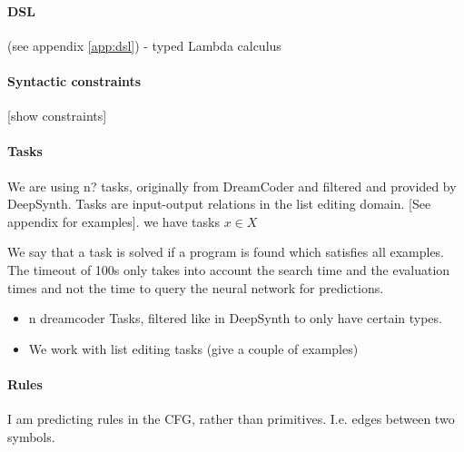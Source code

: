 \paragraph{DSL}
(see appendix \ref{app:dsl})
- typed Lambda calculus 

\paragraph{Syntactic constraints}
[show constraints]

\paragraph{Tasks}
We are using n? tasks, originally from DreamCoder and filtered and provided by DeepSynth.
Tasks are input-output relations in the list editing domain. [See appendix for examples]. 
we have tasks $x \in X$

We say that a task is solved if a program is found which satisfies all examples. The timeout of 100s only takes into account the search time and the evaluation times and not the time to query the neural network for predictions.

\begin{itemize}
    \item n dreamcoder Tasks, filtered like in DeepSynth to only have certain types.
    \item We work with list editing tasks (give a couple of examples)
\end{itemize}


\paragraph{Rules}
I am predicting rules in the CFG, rather than primitives. I.e. edges between two symbols.





